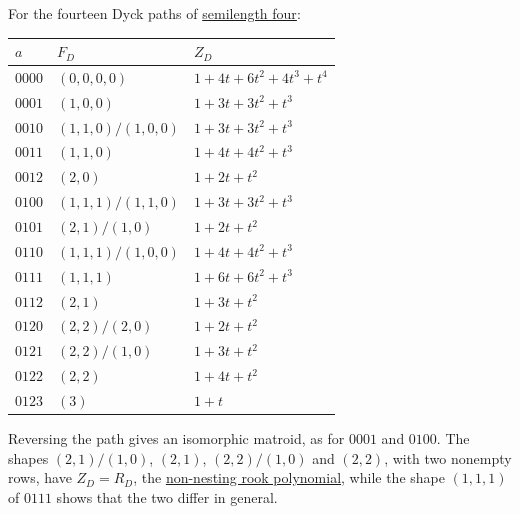 \begin{example*}
For the fourteen Dyck paths of
\hyperref[dyckPathSemilengthFour]{semilength four}:

\begin{tabular}{lll}
\toprule
$a$ & $F_D$ & $Z_D$ \\
\midrule
$0000$ & $(0,0,0,0)$ & $1+4t+6t^2+4t^3+t^4$ \\
$0001$ & $(1,0,0)$ & $1+3t+3t^2+t^3$ \\
$0010$ & $(1,1,0)/(1,0,0)$ & $1+3t+3t^2+t^3$ \\
$0011$ & $(1,1,0)$ & $1+4t+4t^2+t^3$ \\
$0012$ & $(2,0)$ & $1+2t+t^2$ \\
$0100$ & $(1,1,1)/(1,1,0)$ & $1+3t+3t^2+t^3$ \\
$0101$ & $(2,1)/(1,0)$ & $1+2t+t^2$ \\
$0110$ & $(1,1,1)/(1,0,0)$ & $1+4t+4t^2+t^3$ \\
$0111$ & $(1,1,1)$ & $1+6t+6t^2+t^3$ \\
$0112$ & $(2,1)$ & $1+3t+t^2$ \\
$0120$ & $(2,2)/(2,0)$ & $1+2t+t^2$ \\
$0121$ & $(2,2)/(1,0)$ & $1+3t+t^2$ \\
$0122$ & $(2,2)$ & $1+4t+t^2$ \\
$0123$ & $(3)$ & $1+t$ \\
\bottomrule
\end{tabular}

Reversing the path gives an isomorphic matroid, as for $0001$ and $0100$.
The shapes $(2,1)/(1,0)$, $(2,1)$, $(2,2)/(1,0)$ and $(2,2)$, with two
nonempty rows, have $Z_D=R_D$, the
\hyperref[dyckPathSkewPolynomials]{non-nesting rook polynomial}, while the
shape $(1,1,1)$ of $0111$ shows that the two differ in general.
\end{example*}
